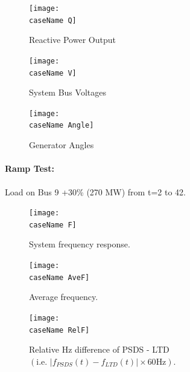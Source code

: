 \documentclass[12pt]{article}
\begin{document}
\pagebreak
	\begin{figure}[h!]
			\centering
			\texttt{[image: \\caseName Q]}\vspace{-.5em}
			\caption{Reactive Power Output}
			\label{\caseName Q}		 
	\end{figure}%

	\begin{figure}[h!]
			\centering
			\texttt{[image: \\caseName V]}\vspace{-.5em}
			\caption{System Bus Voltages}
			\label{\caseName V}		 
	\end{figure}%
	\begin{figure}[h!]
			\centering
			\texttt{[image: \\caseName Angle]}\vspace{-.5em}
			\caption{Generator Angles}
			\label{\caseName Angle}		 
	\end{figure}%


\pagebreak
\renewcommand{\caseName}{kundurRamp1}
\renewcommand{\figW}{1}
\paragraph{Ramp Test:} Load on Bus 9 +30\% (270 MW) from t=2 to 42.
	\begin{figure}[h!]
			\centering
			\texttt{[image: \\caseName F]}\vspace{-.5em}
			\caption{System frequency response.}
			\label{\caseName F}		 
	\end{figure}%
	\begin{figure}[h!]
			\centering
			\texttt{[image: \\caseName AveF]}\vspace{-.5em}
			\caption{Average frequency.}
			\label{\caseName AveF}		 
	\end{figure}%


	\begin{figure}[h!]
			\centering
			\texttt{[image: \\caseName RelF]}\vspace{-.5em}
			\caption{Relative Hz difference of PSDS - LTD $\left( \text{i.e. }  \left|f_{PSDS}(t)- f_{LTD}(t)\right| \times 60 \text{Hz} \right)$.}
			\label{\caseName RelF}		 
	\end{figure}%
\end{document}
